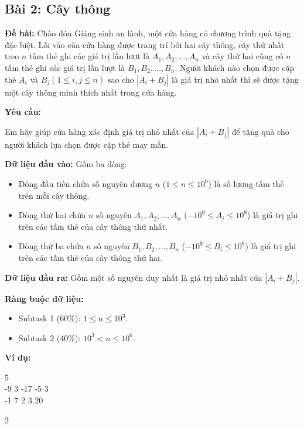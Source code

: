 \documentclass[12pt]{scrartcl}  %
\begin{document}
\subsection{Bài 2: Cây thông}

\textbf{Đề bài:}
Chào đón Giáng sinh an lành, một cửa hàng có chương trình quà tặng đặc biệt. Lối vào của cửa hàng được trang trí bởi hai cây thông, cây thứ nhất treo $n$ tấm thẻ ghi các giá trị lần lượt là $A_1, A_2, \ldots, A_n$ và cây thứ hai cũng có $n$ tấm thẻ ghi các giá trị lần lượt là $B_1, B_2, \ldots, B_n$. Người khách nào chọn được cặp thẻ $A_i$ và $B_j (1 \leq i,j \leq n)$ sao cho $|A_i + B_j|$ là giá trị nhỏ nhất thì sẽ được tặng một cây thông mình thích nhất trong cửa hàng. 

\textbf{Yêu cầu:}

Em hãy giúp cửa hàng xác định giá trị nhỏ nhất của $|A_i + B_j|$ để tặng quà cho người khách lựa chọn được cặp thẻ may mắn.

\textbf{Dữ liệu đầu vào:}
Gồm ba dòng:
\begin{itemize}
    \item Dòng đầu tiên chứa số nguyên dương $n$ ($1 \leq n \leq 10^6$) là số lượng tấm thẻ trên mỗi cây thông.
    \item Dòng thứ hai chứa $n$ số nguyên $A_1, A_2, \ldots, A_n$ ($-10^9 \leq A_i \leq 10^9$) là giá trị ghi trên các tấm thẻ của cây thông thứ nhất.
    \item Dòng thứ ba chứa $n$ số nguyên $B_1, B_2, \ldots, B_n$ ($-10^9 \leq B_i \leq 10^9$) là giá trị ghi trên các tấm thẻ của cây thông thứ hai.
\end{itemize}

\textbf{Dữ liệu đầu ra:}
Gồm một số nguyên duy nhất là giá trị nhỏ nhất của $|A_i + B_j|$.

\textbf{Ràng buộc dữ liệu:}
\begin{itemize}
    \item Subtask 1 (60\%): $1 \leq n \leq 10^3$.
    \item Subtask 2 (40\%): $10^3 < n \leq 10^6$.
\end{itemize}

\textbf{Ví dụ:}
\begin{tcolorbox}[colback=gray!5!white, colframe=blue!50!black, title=Input]
5\\
-9 3 -17 -5 3\\
-1 7 2 3 20
\end{tcolorbox}
\begin{tcolorbox}[colback=gray!5!white, colframe=green!50!black, title=Output]
2
\end{tcolorbox}
\end{document}
